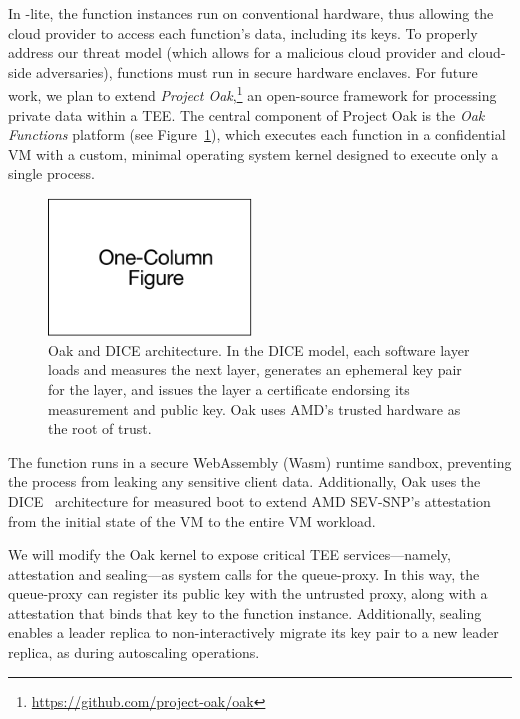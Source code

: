 In \SystemName-lite, the function instances run on conventional hardware, thus
allowing the cloud provider to access each function's data, including its keys.
%
To properly address our threat model (which allows for a malicious cloud
provider and cloud-side adversaries), functions must run in secure hardware
enclaves.
%
For future work, we plan to extend \emph{Project Oak},\footnote{
\url{https://github.com/project-oak/oak}
}
an open-source framework for processing private data within a TEE\@.
%
The central component of Project Oak is the \emph{Oak Functions} platform (see
Figure~\ref{fig:oak}), which executes each function in a confidential VM with a
custom, minimal operating system kernel designed to execute only a single
process.
%
\begin{figure}
    \centering
    \includegraphics[page = 3, width=0.48\textwidth]{diagrams/slides.pdf}
    \caption{Oak and DICE architecture.
    In the DICE model, each software layer loads and measures the next layer,
    generates an ephemeral key pair for the layer, and issues the layer a
    certificate endorsing its measurement and public key.
    Oak uses AMD's trusted hardware as the root of trust.
    }
    \label{fig:oak}
\end{figure}
%
The function runs in a secure WebAssembly (Wasm) runtime sandbox, preventing
the process from leaking any sensitive client data.
%
Additionally, Oak uses the DICE~\cite{24-misc-dice} architecture for measured
boot to extend AMD SEV-SNP's attestation from the initial state of the VM
to the entire VM workload.
%

We will modify the Oak kernel to expose critical TEE services---namely,
attestation and sealing---as system calls for the queue-proxy.
%
In this way, the queue-proxy can register its public key with the untrusted
proxy, along with a attestation that binds that key to the function instance.
%
Additionally, sealing enables a leader replica to non-interactively migrate its
key pair to a new leader replica, as during autoscaling operations.




